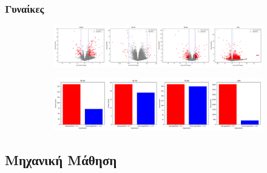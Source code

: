 \documentclass[12pt]{report}
\begin{document}
            \subsubsection*{Γυναίκες}
                \vspace{-0.5cm}
                \begin{figure}[H]
                    \centering
                    \begin{subfigure}[b]{1\textwidth}
                        \centering
                        \includegraphics[width=1\textwidth]{Chapter-3/volcano_plot_consoVisits_Female.png}
                        \label{fig:app_deg_volcano_females}
                    \end{subfigure}
                    \vspace{0.5cm}
                    \begin{subfigure}[b]{1\textwidth}
                        \centering
                        \includegraphics[width=1\textwidth]{Chapter-3/barplot_plot_consoVisits_Female.png}
                        \label{fig:app_deg_bars_females}
                    \end{subfigure}
                \end{figure}
        \subsection*{Μηχανική Μάθηση}
\end{document}
